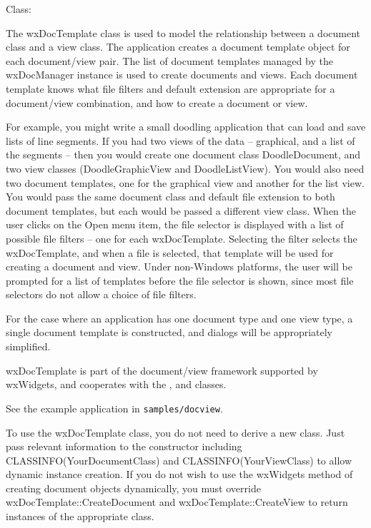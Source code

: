 
Class: 

The wxDocTemplate class is used to model the relationship between a
document class and a view class. The application creates a document
template object for each document/view pair. The list of document
templates managed by the wxDocManager instance is used to create
documents and views. Each document template knows what file filters
and default extension are appropriate for a document/view combination,
and how to create a document or view.

For example, you might write a small doodling application that can load
and save lists of line segments. If you had two views of the data -- graphical,
and a list of the segments -- then you would create one document class DoodleDocument,
and two view classes (DoodleGraphicView and DoodleListView). You would also
need two document templates, one for the graphical view and another for the
list view. You would pass the same document class and default file extension to both
document templates, but each would be passed a different view class. When
the user clicks on the Open menu item, the file selector is displayed
with a list of possible file filters -- one for each wxDocTemplate. Selecting
the filter selects the wxDocTemplate, and when
a file is selected, that template will be used for creating a document
and view. Under non-Windows platforms, the user will be prompted for
a list of templates before the file selector is shown, since most file selectors
do not allow a choice of file filters.

For the case where an application has one document type and one view type,
a single document template is constructed, and dialogs will be appropriately
simplified.

wxDocTemplate is part of the document/view framework supported by wxWidgets,
and cooperates with the ,  
and  classes.

See the example application in {\tt samples/docview}.

To use the wxDocTemplate class, you do not need to derive a new class.
Just pass relevant information to the constructor including CLASSINFO(YourDocumentClass) and
CLASSINFO(YourViewClass) to allow dynamic instance creation.
If you do not wish to use the wxWidgets method of creating document
objects dynamically, you must override wxDocTemplate::CreateDocument
and wxDocTemplate::CreateView to return instances of the appropriate class.

